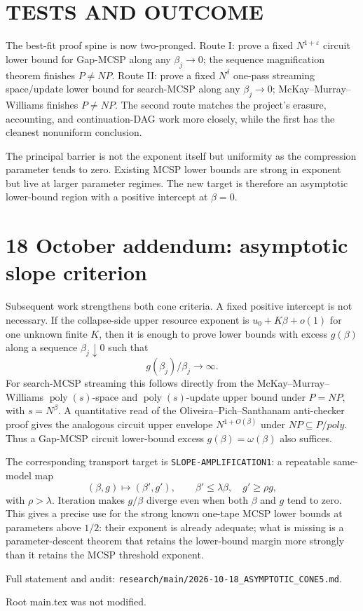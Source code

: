 \documentclass[11pt]{article}
\begin{document}
\section{TESTS AND OUTCOME}
The best-fit proof spine is now two-pronged. Route I: prove a fixed $N^{1+\varepsilon}$ circuit lower bound for Gap-MCSP along any $\beta_j\to0$; the sequence magnification theorem finishes $P\ne NP$. Route II: prove a fixed $N^\delta$ one-pass streaming space/update lower bound for search-MCSP along any $\beta_j\to0$; McKay--Murray--Williams finishes $P\ne NP$. The second route matches the project's erasure, accounting, and continuation-DAG work more closely, while the first has the cleanest nonuniform conclusion.

The principal barrier is not the exponent itself but uniformity as the compression parameter tends to zero. Existing MCSP lower bounds are strong in exponent but live at larger parameter regimes. The new target is therefore an asymptotic lower-bound region with a positive intercept at $\beta=0$.


\section{18 October addendum: asymptotic slope criterion}
Subsequent work strengthens both cone criteria.  A fixed positive intercept is
not necessary.  If the collapse-side upper resource exponent is
\(u_0+K\beta+o(1)\) for one unknown finite \(K\), then it is enough to prove
lower bounds with excess \(g(\beta)\) along a sequence \(\beta_j\downarrow0\)
such that
\[
 \boxed{\;g(\beta_j)/\beta_j\to\infty.\;}
\]
For search-MCSP streaming this follows directly from the
McKay--Murray--Williams \(\operatorname{poly}(s)\)-space and
\(\operatorname{poly}(s)\)-update upper bound under \(P=NP\), with
\(s=N^\beta\).  A quantitative read of the Oliveira--Pich--Santhanam
anti-checker proof gives the analogous circuit upper envelope
\(N^{1+O(\beta)}\) under \(NP\subseteq P/poly\).  Thus a Gap-MCSP circuit
lower-bound excess \(g(\beta)=\omega(\beta)\) also suffices.

The corresponding transport target is \texttt{SLOPE-AMPLIFICATION1}: a
repeatable same-model map
\[
 (\beta,g)\mapsto(\beta',g'),\qquad
 \beta'\le\lambda\beta,\quad g'\ge\rho g,
\]
with \(\rho>\lambda\).  Iteration makes \(g/\beta\) diverge even when both
\(\beta\) and \(g\) tend to zero.  This gives a precise use for the strong
known one-tape MCSP lower bounds at parameters above \(1/2\): their exponent
is already adequate; what is missing is a parameter-descent theorem that
retains the lower-bound margin more strongly than it retains the MCSP
threshold exponent.

Full statement and audit:
\texttt{research/main/2026-10-18\_ASYMPTOTIC\_CONE5.md}.

Root main.tex was not modified.
\end{document}
